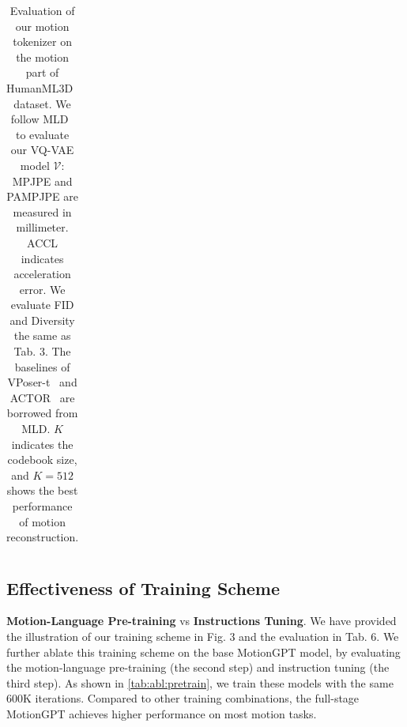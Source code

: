 \begin{table}[t]
{\begin{tabular}{@{}lccccc@{}}
\end{tabular}%
}
\vspace{10pt}
\caption{Evaluation of our motion tokenizer on the motion part of HumanML3D~\cite{Guo_2022_CVPR_humanml3d} dataset. We follow MLD~\cite{chen2023mld} to evaluate our VQ-VAE model $\mathcal{V}$: MPJPE and PAMPJPE are measured in millimeter. ACCL indicates acceleration error. We evaluate FID and Diversity the same as Tab. 3. The baselines of VPoser-t~\cite{vposer_SMPL-X:2019} and ACTOR~\cite{petrovich21actor} are borrowed from MLD. $K$ indicates the codebook size, and $K=512$ shows the best performance of motion reconstruction.}
\label{tab:mr:ablation}
\end{table}

\newpage
\label{sec:pretrian}
\subsection{Effectiveness of Training Scheme} 
\textbf{Motion-Language Pre-training} vs \textbf{Instructions Tuning}. We have provided the illustration of our training scheme in Fig. 3 and the evaluation in Tab. 6. We further ablate this training scheme on the base MotionGPT model, by evaluating the motion-language pre-training (the second step) and instruction tuning (the third step). As shown in \cref{tab:abl:pretrain}, we train these models with the same 600K iterations. Compared to other training combinations, the full-stage MotionGPT achieves higher performance on most motion tasks.

